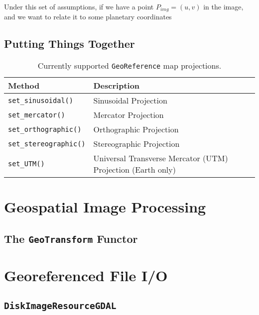 Under this set of assumptions, if we have a point $P_{img} = (u,v)$ in
the image, and we want to relate it to some planetary coordinates

\subsection{Putting Things Together}

\begin{table}[t]\begin{centering}
\begin{tabular}{|l|l|l|} \hline
Method & Description \\ \hline \hline
\verb#set_sinusoidal()# & Sinusoidal Projection \\ \hline
\verb#set_mercator()# & Mercator Projection \\ \hline
\verb#set_orthographic()# & Orthographic Projection \\ \hline
\verb#set_stereographic()# & Stereographic Projection \\ \hline
\verb#set_UTM()# & Universal Transverse Mercator (UTM) Projection (Earth only) \\ \hline
\end{tabular}
\caption{Currently supported {\tt GeoReference} map projections.}
\label{tbl:georeference-map-projections}
\end{centering}\end{table}


\section{Geospatial Image Processing}
\subsection{The {\tt GeoTransform} Functor}

\section{Georeferenced File I/O}
\subsection{{\tt DiskImageResourceGDAL}}
